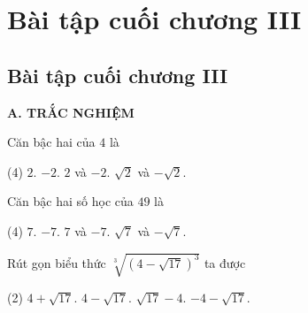 %

\section*{Bài tập cuối chương III}

\begin{exercises}
    \subsection{Bài tập cuối chương III}

    \textbf{A. TRẮC NGHIỆM}

    \begin{questions}[resume=SGK]
        \item Căn bậc hai của $4$ là
        \begin{tasks}(4)
            \task[(A)] $2$.
            \task[(B)] $-2$.
            \task[(C)] $2$ và $-2$.
            \task[(D)] $\sqrt{2}$ và $-\sqrt{2}$.
        \end{tasks}
        \par\noindent\answerbox\par

        \item Căn bậc hai số học của $49$ là
        \begin{tasks}(4)
            \task[(A)] $7$.
            \task[(B)] $-7$.
            \task[(C)] $7$ và $-7$.
            \task[(D)] $\sqrt{7}$ và $-\sqrt{7}$.
        \end{tasks}
        \par\noindent\answerbox\par

        \item Rút gọn biểu thức $\sqrt[3]{\left(4-\sqrt{17}\right)^3}$ ta được
        \begin{tasks}(2)
            \task[(A)] $4+\sqrt{17}$.
            \task[(B)] $4-\sqrt{17}$.
            \task[(C)] $\sqrt{17}-4$.
            \task[(D)] $-4-\sqrt{17}$.
        \end{tasks}
        \par\noindent\answerbox\par


\end{questions}
\end{exercises}
